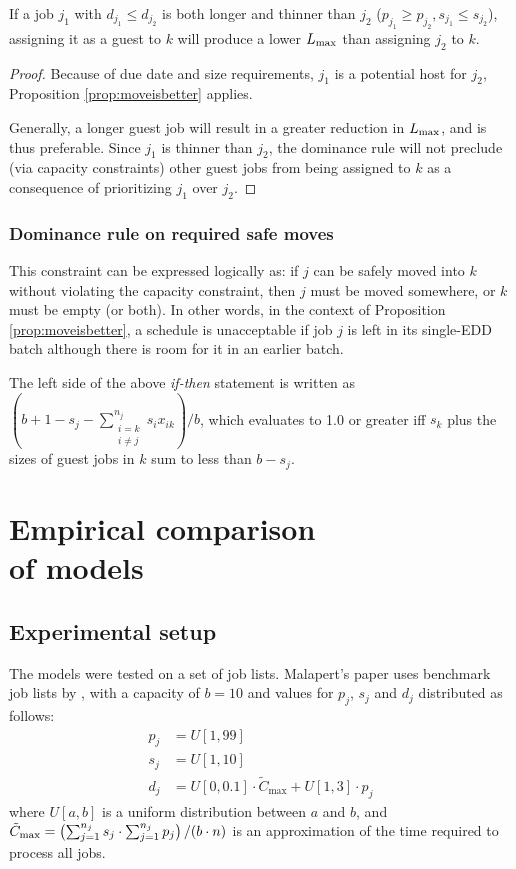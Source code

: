 \documentclass[13pt, letterpaper, oneside]{book}
\begin{document}
\begin{proposition} If a job $j_1$ with $d_{j_1} \leq d_{j_2}$ is both longer
and thinner than $j_2$ ($p_{j_1} \geq p_{j_2}, s_{j_1} \leq s_{j_2}$), assigning
it as a guest to $k$ will produce a lower $L_{\text{max}}$ than assigning $j_2$ to $k$.

\begin{proof}
Because of due date and size requirements, $j_1$ is a potential host for $j_2$,
Proposition \ref{prop:moveisbetter} applies. 

Generally, a longer guest job will result in a greater reduction in $L_{\text{max}}$, and
is thus preferable. Since $j_1$ is thinner than $j_2$, the dominance rule will
not preclude (via capacity constraints) other guest jobs from being assigned to
$k$ as a consequence of prioritizing $j_1$ over $j_2$.
\end{proof}
\end{proposition}

\subsection{Dominance rule on required safe moves}
This constraint can be expressed logically as: if $j$ can be safely moved into $k$
without violating the capacity constraint, then $j$ must be moved somewhere, or
$k$ must be empty (or both). In other words, in the context of Proposition
\ref{prop:moveisbetter}, a schedule is unacceptable if job $j$ is left in its
single-EDD batch although there is room for it in an earlier batch.

The left side of the above \textit{if-then} statement is written as $(b + 1 -
s_j - \sum_{\substack{{i = k}\\{i \neq j}}}^{n_j} s_i x_{ik}) / b$, which
evaluates to 1.0 or greater iff $s_k$ plus the sizes of guest jobs in $k$ sum to
less than $b - s_j$.




\chapter[Empirical comparison of models]{Empirical comparison\\ of models}
\section{Experimental setup}\label{sec:results}
The models were tested on a set of job lists. Malapert's paper uses benchmark
job lists by \citet{Daste1, Daste2}, with a capacity of $b = 10$ and values for
$p_j$, $s_j$ and $d_j$ distributed as follows:
\begin{align}
p_j &= U[1, 99] \\
s_j &= U[1, 10] \\
d_j &= U[0, 0.1] \cdot \tilde{C}_\text{max} + U[1, 3] \cdot p_j
\end{align}
where $U[a, b]$ is a uniform distribution between $a$ and $b$, and $\tilde{C}_\text{max} = \left( \sum_{j=1}^{n_j} s_j \cdot \sum_{j=1}^{n_j}
p_j \right) /\\ (b \cdot n)$ is an approximation of the time required to process
all jobs.
\end{document}
